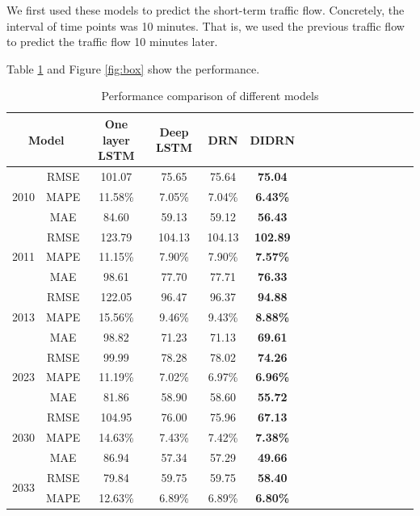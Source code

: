 \documentclass[twocolumn]{article}
\begin{document}
\par 
We first used these models to predict the short-term traffic flow. Concretely, the interval of time points was 10 minutes. That is, we used the previous traffic flow to predict the traffic flow 10 minutes later. 
\par
Table \ref{tab:1} and Figure \ref{fig:box} show the performance.
\begin{table}
    \centering
    \caption{Performance comparison of different models}
    \label{tab:1}
    \begin{tabular}{cccccccccccccccc}
    \toprule
        \multicolumn{2}{c}{Model} & One layer LSTM & Deep LSTM & DRN & DIDRN \\
        \midrule
        \multirow{3}{*}{2010} &RMSE &  101.07 & 75.65& 75.64 & \textbf{75.04}\\
        & MAPE &  11.58\%  & 7.05\%
  & 7.04\% & \textbf{6.43\%} \\
        & MAE & 84.60 & 59.13 & 59.12 & \textbf{56.43}\\
        \hline
        \multirow{3}{*}{2011} & RMSE & 123.79 & 104.13 &104.13 & \textbf{102.89}\\
        & MAPE  &11.15\% &7.90\% & 7.90\%
 & \textbf{7.57\%}
\\
        & MAE  & 98.61 & 77.70& 77.71 & \textbf{76.33}
\\
        \hline
        \multirow{3}{*}{2013} &RMSE  &122.05 &96.47 & 96.37 & \textbf{94.88} \\
        & MAPE  & 15.56\% & 9.46\%
& 9.43\% & \textbf{8.88\%}
\\
        & MAE  & 98.82 & 71.23& 71.13 & \textbf{69.61}
\\
\hline
        \multirow{3}{*}{2023} &RMSE& 99.99 &78.28 & 78.02 & \textbf{74.26} \\
        & MAPE &11.19\% & 7.02\%
& 6.97\% & \textbf{6.96\%}
\\
        & MAE & 81.86 &58.90 & 58.60 & \textbf{55.72}\\
        \hline
        \multirow{3}{*}{2030}&RMSE  &104.95 &76.00 & 75.96 & \textbf{67.13}\\
        & MAPE &14.63\%&7.43\% 
 & 7.42\% & \textbf{7.38\%}
\\
        & MAE & 86.94 & 57.34&  57.29 & \textbf{49.66}\\
        \hline
        \multirow{3}{*}{2033}&RMSE &79.84 &59.75 & 59.75 & \textbf{58.40} \\
        & MAPE & 12.63\% &6.89\%
 & 6.89\% & \textbf{6.80\%}

\end{tabular}
\end{table}
\end{document}
